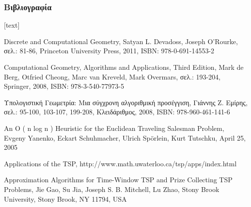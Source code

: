 \documentclass[xcolor=dvipsnames, 11pt]{beamer}
\begin{document}
\begin{frame}
	\frametitle{Βιβλιογραφία}
	\footnotesize
	\begin{thebibliography}{depth}
		
		Discrete and Computational Geometry, 
		Satyan L. Devadoss, Joseph O'Rourke,
		σελ.: 81-86,
		Princeton University Press, 2011, 
		ISBN: 978-0-691-14553-2
		
		Computational Geometry,	Algorithms and Applications, Third Edition, 
		Mark de Berg, Otfried Cheong, Marc van Kreveld, Mark Overmars,
		σελ.: 193-204,
		Springer, 2008, 
		ISBN: 978-3-540-77973-5
		
		Υπολογιστική Γεωμετρία: Μια σύγχρονη αλγοριθμική προσέγγιση, 
		Γιάννης Ζ. Εμίρης,
		σελ.: 95-100, 103-107, 199-208,
		Κλειδάριθμος, 2008, 
		ISBN: 978-960-461-141-6 
		
		An O ( n log n ) Heuristic for the Euclidean Traveling Salesman Problem, 
		Evgeny Yanenko, Eckart
		Schuhmacher, Ulrich Spörlein, Kurt Tutschku,
		April 25, 2005
		
		Applications of the TSP,
		http://www.math.uwaterloo.ca/tsp/apps/index.html
		
		Approximation Algorithms for Time-Window
		TSP and Prize Collecting TSP Problems,
		Jie Gao, Su Jia, Joseph S. B. Mitchell, Lu Zhao,
		Stony Brook University, Stony Brook, NY 11794, USA
	\end{thebibliography}
\end{frame}
\end{document}
